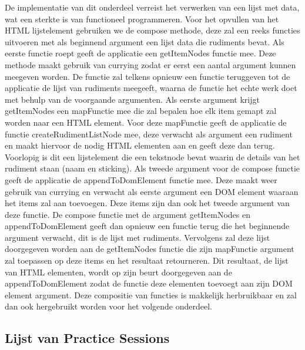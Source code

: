 De implementatie van dit onderdeel verreist het verwerken van een lijst met data, wat een sterkte is van functioneel programmeren. Voor het opvullen van het HTML lijstelement gebruiken we de compose methode, deze zal een reeks functies uitvoeren met als beginnend argument een lijst data die rudiments bevat. Als eerste functie roept geeft de applicatie een getItemNodes functie mee. Deze methode maakt gebruik van currying zodat er eerst een aantal argument kunnen meegeven worden. De functie zal telkens opnieuw een functie teruggeven tot de applicatie de lijst van rudiments meegeeft, waarna de functie het echte werk doet met behulp van de voorgaande argumenten. Als eerste argument krijgt getItemNodes een mapFunctie mee die zal bepalen hoe elk item gemapt zal worden naar een HTML element. Voor deze mapFunctie geeft de applicatie de functie createRudimentListNode mee, deze verwacht als argument een rudiment en maakt hiervoor de nodig HTML elementen aan en geeft deze dan terug. Voorlopig is dit een lijstelement die een tekstnode bevat waarin de details van het rudiment staan (naam en sticking). Als tweede argument voor de compose functie geeft de applicatie de appendToDomElement functie mee. Deze maakt weer gebruik van currying en verwacht als eerste argument een DOM element waaraan het items zal aan toevoegen. Deze items zijn dan ook het tweede argument van deze functie. De compose functie met de argument getItemNodes en appendToDomElement geeft dan opnieuw een functie terug die het beginnende argument verwacht, dit is de lijst met rudiments. Vervolgens zal deze lijst doorgegeven worden aan de getItemNodes functie die zijn mapFunctie argument zal toepassen op deze items en het resultaat retourneren. Dit resultaat, de lijst van HTML elementen, wordt op zijn beurt doorgegeven aan de appendToDomElement zodat de functie deze elementen toevoegt aan zijn DOM element argument. Deze compositie van functies is makkelijk herbruikbaar en zal dan ook hergebruikt worden voor het volgende onderdeel.

 \subsection{Lijst van Practice Sessions}
 